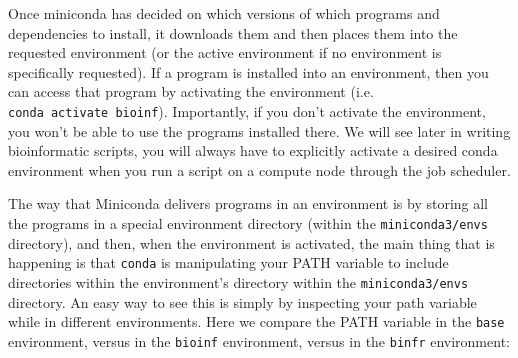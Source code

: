 \documentclass[]{krantz}
\begin{document}
Once miniconda has decided on which versions of which programs and dependencies to install,
it downloads them and then places them into the requested environment (or the active environment
if no environment is specifically requested). If a program is installed into an environment, then you
can access that program by activating the environment (i.e. \texttt{conda\ activate\ bioinf}). Importantly,
if you don't activate the environment, you won't be able to use the programs installed there.
We will see later in writing bioinformatic scripts, you will always have to explicitly
activate a desired conda environment when you run a script on a compute node through the job
scheduler.

The way that Miniconda delivers programs in an environment is by storing all the programs
in a special environment directory (within the \texttt{miniconda3/envs} directory), and then, when
the environment is activated, the main thing that is happening is that \texttt{conda} is manipulating your
PATH variable to include directories within the environment's directory
within the \texttt{miniconda3/envs} directory. An easy way to see this is simply by
inspecting your path variable while in different environments. Here we compare the PATH
variable in the \texttt{base} environment, versus in the \texttt{bioinf} environment, versus in the
\texttt{binfr} environment:
\end{document}
